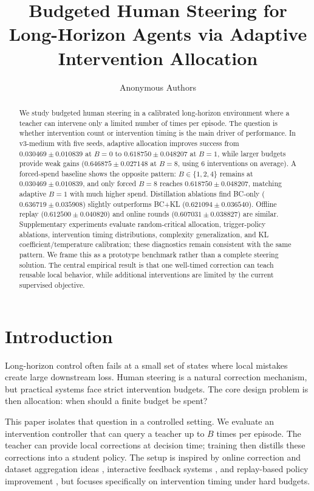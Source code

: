 \documentclass{article}
\title{Budgeted Human Steering for Long-Horizon Agents via Adaptive Intervention Allocation}
\author{Anonymous Authors}
\date{}
\begin{document}
\maketitle

\begin{abstract}
We study budgeted human steering in a calibrated long-horizon environment where a teacher can intervene only a limited number of times per episode. The question is whether intervention count or intervention timing is the main driver of performance. In v3-medium with five seeds, adaptive allocation improves success from $0.030469\pm0.010839$ at $B{=}0$ to $0.618750\pm0.048207$ at $B{=}1$, while larger budgets provide weak gains ($0.646875\pm0.027148$ at $B{=}8$, using 6 interventions on average). A forced-spend baseline shows the opposite pattern: $B\in\{1,2,4\}$ remains at $0.030469\pm0.010839$, and only forced $B{=}8$ reaches $0.618750\pm0.048207$, matching adaptive $B{=}1$ with much higher spend. Distillation ablations find BC-only ($0.636719\pm0.035908$) slightly outperforms BC+KL ($0.621094\pm0.036540$). Offline replay ($0.612500\pm0.040820$) and online rounds ($0.607031\pm0.038827$) are similar. Supplementary experiments evaluate random-critical allocation, trigger-policy ablations, intervention timing distributions, complexity generalization, and KL coefficient/temperature calibration; these diagnostics remain consistent with the same pattern. We frame this as a prototype benchmark rather than a complete steering solution. The central empirical result is that one well-timed correction can teach reusable local behavior, while additional interventions are limited by the current supervised objective.
\end{abstract}

\section{Introduction}
Long-horizon control often fails at a small set of states where local mistakes create large downstream loss. Human steering is a natural correction mechanism, but practical systems face strict intervention budgets. The core design problem is then allocation: when should a finite budget be spent?

This paper isolates that question in a controlled setting. We evaluate an intervention controller that can query a teacher up to $B$ times per episode. The teacher can provide local corrections at decision time; training then distills these corrections into a student policy. The setup is inspired by online correction and dataset aggregation ideas \citep{ross2011dagger}, interactive feedback systems \citep{knox2008tamer,warnell2018deeptamer}, and replay-based policy improvement \citep{rolnick2019clear}, but focuses specifically on intervention timing under hard budgets.
\end{document}
